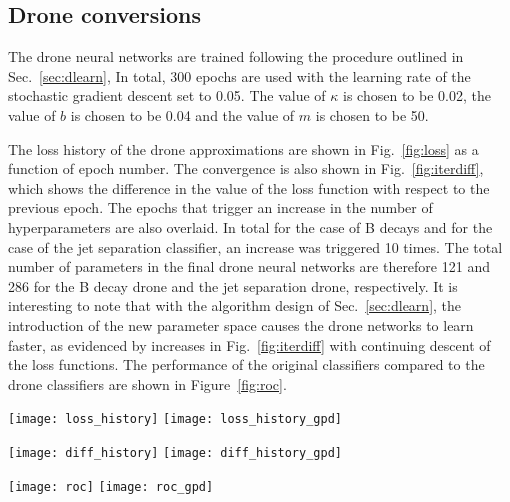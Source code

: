\subsection{Drone conversions}

The drone neural networks are trained following the procedure outlined in Sec.~\ref{sec:dlearn},
In total, 300 epochs are used with
the learning rate of the stochastic gradient descent set to 0.05.
The value of $\kappa$ is chosen to be 0.02, the value of $b$ is chosen to
be 0.04 and the value of $m$ is chosen to be 50.

The loss history of the drone approximations are shown in Fig.~\ref{fig:loss}
as a function of epoch number.
The convergence is also shown in Fig.~\ref{fig:iterdiff}, which shows
the difference in the value of the loss function with respect to the previous
epoch. The epochs that trigger an increase in the number of hyperparameters
are also overlaid.
In total for the case of B decays and for the case of the jet separation classifier, 
an increase was triggered 10 times.
The total number
of parameters in the final drone neural networks are therefore 121 and 286 for the B decay drone
and the jet separation drone, respectively. It is interesting
to note that with the algorithm design of Sec.~\ref{sec:dlearn}, the introduction
of the new parameter space causes the drone networks to learn faster, as evidenced by
increases in Fig.~\ref{fig:iterdiff} with continuing descent of the loss functions.
%
The performance of the original classifiers compared to the drone classifiers are shown in Figure~\ref{fig:roc}.
\begin{figure*}[t]
\centering
\texttt{[image: loss\_history]}
\texttt{[image: loss\_history\_gpd]}
\caption{\small
Convergence of the loss function during the drone training
  for the case of the B
  decay (left) and jet separation (right) examples.
}
\label{fig:loss}
\end{figure*}
\begin{figure*}[t]
\centering
\texttt{[image: diff\_history]}
\texttt{[image: diff\_history\_gpd]}
\caption{\small
Difference in the loss function with respect to the previous iteration
  for the case of the B
  decay (left) and jet separation (right) examples.
  The green triangles
depict the epoch number in which the number of hyperperameters was increased.
}
\label{fig:iterdiff}
\end{figure*}
\begin{figure*}[t]
\centering
\texttt{[image: roc]}
\texttt{[image: roc\_gpd]}
\caption{\small
  Signal efficiency versus background rejection of the original classifier (red) and drone
  approximation (blue)
  for the case of the B
  decay (left) and jet separation (right) examples.
}
\label{fig:roc}
\end{figure*}


